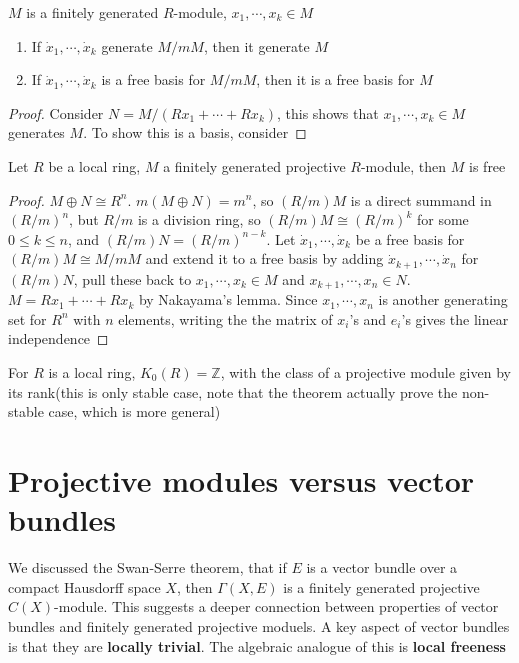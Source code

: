 \documentclass[main]{subfiles}
\begin{document}
\begin{corollary}
$M$ is a finitely generated $R$-module, $x_1,\cdots,x_k\in M$
\begin{enumerate}
\item If $\dot x_1,\cdots,\dot x_k$ generate $M/mM$, then it generate $M$
\item If $\dot x_1,\cdots,\dot x_k$ is a free basis for $M/mM$, then it is a free basis for $M$
\end{enumerate}
\end{corollary}

\begin{proof}
Consider $N=M/(Rx_1+\cdots+Rx_k)$, this shows that $x_1,\cdots,x_k\in M$ generates $M$. To show this is a basis, consider 
\end{proof}

\begin{theorem}
Let $R$ be a local ring, $M$ a finitely generated projective $R$-module, then $M$ is free
\end{theorem}

\begin{proof}
$M\oplus N\cong R^n$. $m(M\oplus N)=m^n$, so $(R/m)M$ is a direct summand  in $(R/m)^n$, but $R/m$ is a division ring, so $(R/m)M\cong (R/m)^k$ for some $0\leq k\leq n$, and $(R/m)N=(R/m)^{n-k}$. Let $\dot x_1,\cdots,\dot x_k$ be a free basis for $(R/m)M\cong M/mM$ and extend it to a free basis by adding $\dot x_{k+1},\cdots,\dot x_n$ for $(R/m)N$, pull these back to $x_1,\cdots,x_k\in M$ and $x_{k+1},\cdots,x_n\in N$. $M=Rx_1+\cdots +Rx_k$ by Nakayama's lemma. Since $x_1,\cdots,x_n$ is another generating set for $R^n$ with $n$ elements, writing the the matrix of $x_i$'s and $e_i$'s gives the linear independence
\end{proof}

\begin{corollary}
For $R$ is a local ring, $K_0(R)=\mathbb Z$, with the class of a projective module given by its rank(this is only stable case, note that the theorem actually prove the non-stable case, which is more general)
\end{corollary}

\section{Projective modules versus vector bundles}

We discussed the Swan-Serre theorem, that if $E$ is a vector bundle over a compact Hausdorff space $X$, then $\Gamma(X,E)$ is a finitely generated projective $C(X)$-module. This suggests a deeper connection between properties of vector bundles and finitely generated projective moduels. A key aspect of vector bundles is that they are \textbf{locally trivial}. The algebraic analogue of this is \textbf{local freeness}
\end{document}
